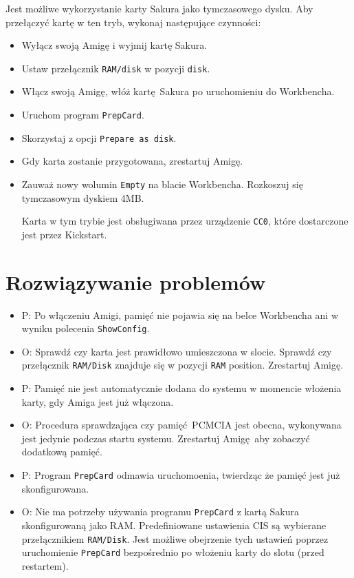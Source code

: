 \documentclass[10pt,a4paper]{article}
\begin{document}
Jest możliwe wykorzystanie karty Sakura jako tymczasowego dysku. Aby przełączyć kartę w ten tryb, wykonaj następujące czynności:
\begin{itemize}
	\item Wyłącz swoją Amigę i wyjmij kartę Sakura.
	\item Ustaw przełącznik {\tt RAM/disk} w pozycji {\tt disk}.
	\item Włącz swoją Amigę, włóż kartę Sakura po uruchomieniu do Workbencha.
	\item Uruchom program {\tt PrepCard}.
	\item Skorzystaj z opcji {\tt Prepare as disk}.
	\item Gdy karta zostanie przygotowana, zrestartuj Amigę.
	\item Zauważ nowy wolumin {\tt Empty} na blacie Workbencha. Rozkoszuj się tymczasowym dyskiem 4MB.

Karta w tym trybie jest obsługiwana przez urządzenie {\tt CC0}, które dostarczone jest przez Kickstart.
\end{itemize}

\section*{Rozwiązywanie problemów}

\begin{itemize}
	\item P: Po włączeniu Amigi, pamięć nie pojawia się na belce Workbencha ani w wyniku polecenia {\tt ShowConfig}.
	\item O: Sprawdź czy karta jest prawidłowo umieszczona w slocie. Sprawdź czy przełącznik {\tt RAM/Disk} znajduje się w pozycji {\tt RAM} position. Zrestartuj Amigę.
\end{itemize}

\begin{itemize}
	\item P: Pamięć nie jest automatycznie dodana do systemu w momencie włożenia karty, gdy Amiga jest już włączona.
	\item O: Procedura sprawdzająca czy pamięć PCMCIA jest obecna, wykonywana jest jedynie podczas startu systemu. Zrestartuj Amigę aby zobaczyć dodatkową pamięć. 
\end{itemize}

\begin{itemize}
	\item P: Program {\tt PrepCard} odmawia uruchomoenia, twierdząc że pamięć jest już skonfigurowana.
	\item O: Nie ma potrzeby używania programu {\tt PrepCard} z kartą Sakura skonfigurowaną jako RAM. Predefiniowane ustawienia CIS są wybierane przełącznikiem {\tt RAM/Disk}. Jest możliwe obejrzenie tych ustawień poprzez uruchomienie {\tt PrepCard} bezpośrednio po włożeniu karty do slotu (przed restartem). 
\end{itemize}
\end{document}
